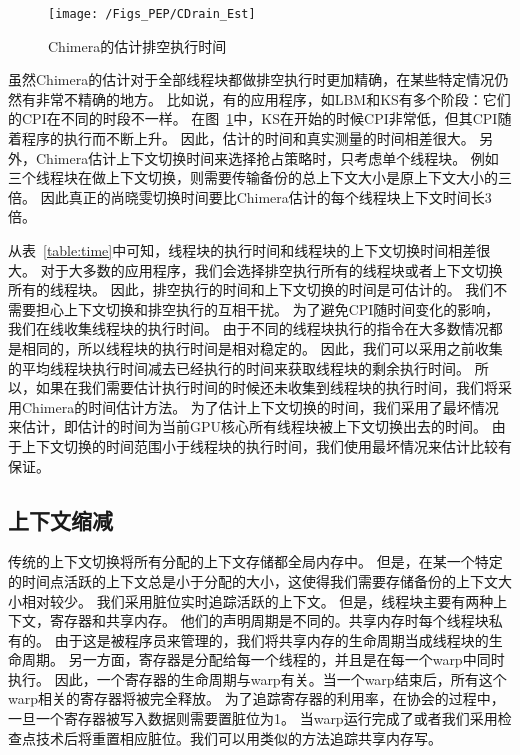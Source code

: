 \begin{figure}[htbp] %
  \centering
  \texttt{[image: /Figs\_PEP/CDrain\_Est]}
  \caption{Chimera的估计排空执行时间}
  \label{fig:CDrain_Est}
\end{figure}


虽然Chimera的估计对于全部线程块都做排空执行时更加精确，在某些特定情况仍然有非常不精确的地方。
比如说，有的应用程序，如LBM和KS有多个阶段：它们的CPI在不同的时段不一样。
在图~\ref{fig:CDrain_Est}中，KS在开始的时候CPI非常低，但其CPI随着程序的执行而不断上升。
因此，估计的时间和真实测量的时间相差很大。
另外，Chimera估计上下文切换时间来选择抢占策略时，只考虑单个线程块。
例如三个线程块在做上下文切换，则需要传输备份的总上下文大小是原上下文大小的三倍。
因此真正的尚晓雯切换时间要比Chimera估计的每个线程块上下文时间长3倍。

从表~\ref{table:time}中可知，线程块的执行时间和线程块的上下文切换时间相差很大。
对于大多数的应用程序，我们会选择排空执行所有的线程块或者上下文切换所有的线程块。
因此，排空执行的时间和上下文切换的时间是可估计的。
我们不需要担心上下文切换和排空执行的互相干扰。
为了避免CPI随时间变化的影响，我们在线收集线程块的执行时间。
由于不同的线程块执行的指令在大多数情况都是相同的，所以线程块的执行时间是相对稳定的。
因此，我们可以采用之前收集的平均线程块执行时间减去已经执行的时间来获取线程块的剩余执行时间。
所以，如果在我们需要估计执行时间的时候还未收集到线程块的执行时间，我们将采用Chimera的时间估计方法。
为了估计上下文切换的时间，我们采用了最坏情况来估计，即估计的时间为当前GPU核心所有线程块被上下文切换出去的时间。
由于上下文切换的时间范围小于线程块的执行时间，我们使用最坏情况来估计比较有保证。


\subsection{上下文缩减}
传统的上下文切换将所有分配的上下文存储都全局内存中。
但是，在某一个特定的时间点活跃的上下文总是小于分配的大小，这使得我们需要存储备份的上下文大小相对较少。
我们采用脏位实时追踪活跃的上下文。
但是，线程块主要有两种上下文，寄存器和共享内存。
他们的声明周期是不同的。共享内存时每个线程块私有的。
由于这是被程序员来管理的，我们将共享内存的生命周期当成线程块的生命周期。
另一方面，寄存器是分配给每一个线程的，并且是在每一个warp中同时执行。
因此，一个寄存器的生命周期与warp有关。当一个warp结束后，所有这个warp相关的寄存器将被完全释放。
为了追踪寄存器的利用率，在协会的过程中，一旦一个寄存器被写入数据则需要置脏位为1。
当warp运行完成了或者我们采用检查点技术后将重置相应脏位。我们可以用类似的方法追踪共享内存写。

